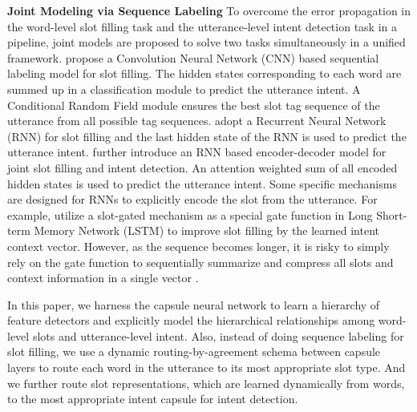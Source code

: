 \noindent\textbf{Joint Modeling via Sequence Labeling}
To overcome the error propagation in the word-level slot filling task and the utterance-level intent detection task in a pipeline, joint models are proposed to solve two tasks simultaneously in a unified framework.
\citet{xu2013convolutional} propose a Convolution Neural Network (CNN) based sequential labeling model for slot filling. The hidden states corresponding to each word are summed up in a classification module to predict the utterance intent. A Conditional Random Field module ensures the best slot tag sequence of the utterance from all possible tag sequences.
\citet{hakkani2016multi} adopt a Recurrent Neural Network (RNN) for slot filling and the last hidden state of the RNN is used to predict the utterance intent. 
\citet{liu2016attention} further introduce an RNN based encoder-decoder model for joint slot filling and intent detection. An attention weighted sum of all encoded hidden states is used to predict the utterance intent.
Some specific mechanisms are designed for RNNs to explicitly encode the slot from the utterance. For example, \citet{goo2018slot} utilize a slot-gated mechanism as a special gate function in Long Short-term Memory Network (LSTM) to improve slot filling by the learned intent context vector.
However, as the sequence becomes longer, it is risky to simply rely on the gate function to sequentially summarize and compress all slots and context information in a single vector \cite{cheng2016long}.

In this paper, we harness the capsule neural network to learn a hierarchy of feature detectors and explicitly model the hierarchical relationships among word-level slots and utterance-level intent. Also, instead of doing sequence labeling for slot filling, we use a dynamic routing-by-agreement schema between capsule layers to route each word in the utterance to its most appropriate slot type. And we further route slot representations, which are learned dynamically from words, to the most appropriate intent capsule for intent detection.